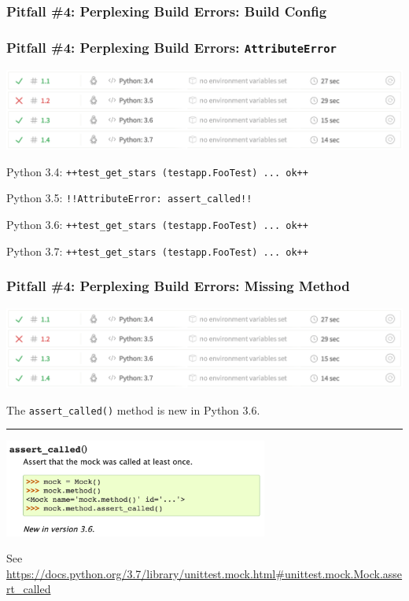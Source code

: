 \documentclass[xcolor={svgnames}]{beamer}
\newcommand{\ttcode}[2][]{\lstinline[style=plain,basicstyle=\ttfamily#1]{#2}}
\newcommand{\pycode}[2][]{\lstinline[style=python,#1]{#2}}
\newcommand{\pyfile}[2][]{}
\newcommand{\hr}[2]{\vspace{#1}\hrule height 0.01mm\vspace{#2}}
\begin{document}
\begin{frame}[t,fragile]
    \frametitle{Pitfall \#4: Perplexing Build Errors: Build Config}
    \pyfile{examples/ex3/.travis.yml}
\end{frame}


\begin{frame}[t,fragile]
    \frametitle{Pitfall \#4: Perplexing Build Errors: \ttcode{AttributeError}}

    \hspace{-2mm}
    \includegraphics[width=\textwidth]{img/travis1.png}

    \medskip
    Python 3.4: \ttcode{++test_get_stars (testapp.FooTest) ... ok++}

    \medskip
    Python 3.5: \ttcode{!!AttributeError: assert_called!!}

    \medskip
    Python 3.6: \ttcode{++test_get_stars (testapp.FooTest) ... ok++}

    \medskip
    Python 3.7: \ttcode{++test_get_stars (testapp.FooTest) ... ok++}
\end{frame}


\begin{frame}[t,fragile]
    \frametitle{Pitfall \#4: Perplexing Build Errors: Missing Method}

    \hspace{-2mm}
    \includegraphics[width=\textwidth]{img/travis1.png}

    \footnotesize
    The \pycode{assert_called()} method is new in Python 3.6.

    \hr{3.5mm}{0mm}

    \includegraphics[width=0.65\textwidth]{img/assert-called-doc.png}

    \vspace{-3mm}
    {
    \scriptsize
    See
    \url{https://docs.python.org/3.7/library/unittest.mock.html#unittest.mock.Mock.assert_called}
    }
\end{frame}
\end{document}
